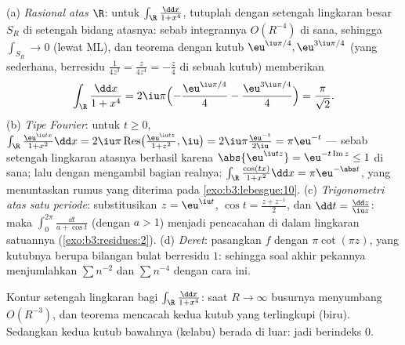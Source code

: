 \begin{example}
\label{ex:b3:residues:integrals}
(a) \emph{Rasional atas $\R$}: untuk $\int_\R\frac{\dd x}{1 +
x^4}$, tutuplah dengan setengah lingkaran besar $S_R$ di setengah bidang
atasnya: sebab integrannya $O(R^{-4})$ di sana, sehingga
$\int_{S_R} \to 0$ (lewat ML), dan teorema  dengan
kutub $\eu^{\iu\pi/4}, \eu^{3\iu\pi/4}$ (yang sederhana, berresidu
$\frac1{4z^3} = \frac{z}{4z^4} = -\frac z4$ di sebuah kutub) memberikan
\[
\int_\R\frac{\dd x}{1 + x^4}
= 2\iu\pi\Bigl(-\frac{\eu^{\iu\pi/4}}4 -
\frac{\eu^{3\iu\pi/4}}4\Bigr)
= \frac{\pi}{\sqrt2} .
\]
(b) \emph{Tipe Fourier}: untuk $t \geq 0$,
$\int_\R\frac{\eu^{\iu tx}}{1 + x^2}\dd x =
2\iu\pi\operatorname{Res}\bigl(\tfrac{\eu^{\iu tz}}{1+z^2},
\iu\bigr) = 2\iu\pi\frac{\eu^{-t}}{2\iu} = \pi\eu^{-t}$ ---
sebab setengah lingkaran atasnya berhasil karena $\abs{\eu^{\iu tz}} =
\eu^{-t\operatorname{Im}z} \leq 1$ di sana; lalu dengan mengambil bagian realnya:
$\int_\R\frac{\cos(tx)}{1+x^2}\dd x = \pi\eu^{-\abs t}$,
yang menuntaskan rumus yang diterima pada \cref{exo:b3:lebesgue:10}.
(c) \emph{Trigonometri atas satu periode}: substitusikan $z =
\eu^{\iu t}$, $\cos t = \frac{z + z^{-1}}2$, dan $\dd t =
\frac{\dd z}{\iu z}$: maka $\int_0^{2\pi}\frac{\dd t}{a + \cos t}$
(dengan $a > 1$) menjadi pencacahan  di dalam lingkaran satuannya
(\cref{exo:b3:residues:2}).
(d) \emph{Deret}: pasangkan $f$ dengan $\pi\cot(\pi z)$, yang kutubnya
berupa bilangan bulat berresidu $1$: sehingga soal akhir pekannya menjumlahkan
$\sum n^{-2}$ dan $\sum n^{-4}$ dengan cara ini.
\end{example}

\begin{omfigure}

{\small Kontur setengah lingkaran bagi $\int_\R\frac{\dd x}{1 +
x^4}$: saat $R \to \infty$ busurnya menyumbang $O(R^{-3})$, dan
teorema  mencacah kedua kutub yang terlingkupi (biru). Sedangkan
kedua kutub bawahnya (kelabu) berada di luar: jadi berindeks $0$.}
\end{omfigure}

